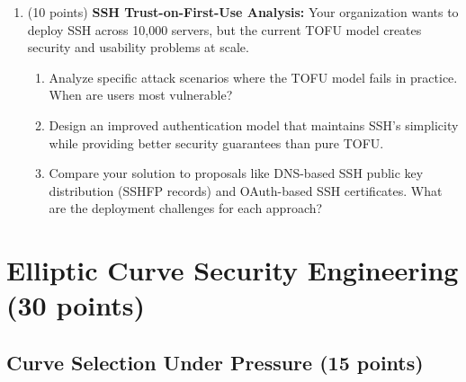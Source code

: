 \documentclass[10pt,a4paper,american]{article}
\begin{document}
\begin{enumerate}
	\item (10 points) \textbf{SSH Trust-on-First-Use Analysis:}
	      Your organization wants to deploy SSH across 10,000 servers, but the current TOFU model creates security and usability problems at scale.
	      \begin{enumerate}
		      \item Analyze specific attack scenarios where the TOFU model fails in practice. When are users most vulnerable?
		      \item Design an improved authentication model that maintains SSH's simplicity while providing better security guarantees than pure TOFU.
		      \item Compare your solution to proposals like DNS-based SSH public key distribution (SSHFP records) and OAuth-based SSH certificates. What are the deployment challenges for each approach?
	      \end{enumerate}
\end{enumerate}

\clearpage

\section{Elliptic Curve Security Engineering (30 points)}

\subsection{Curve Selection Under Pressure (15 points)}
\end{document}
